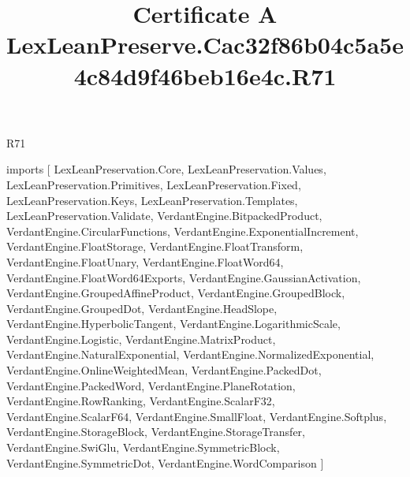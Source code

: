 \begin{lexlean}{R71}
\title{Certificate A LexLeanPreserve.Cac32f86b04c5a5e4c84d9f46beb16e4c.R71}
\begin{coremodule}
imports [
  LexLeanPreservation.Core,
  LexLeanPreservation.Values,
  LexLeanPreservation.Primitives,
  LexLeanPreservation.Fixed,
  LexLeanPreservation.Keys,
  LexLeanPreservation.Templates,
  LexLeanPreservation.Validate,
  VerdantEngine.BitpackedProduct,
  VerdantEngine.CircularFunctions,
  VerdantEngine.ExponentialIncrement,
  VerdantEngine.FloatStorage,
  VerdantEngine.FloatTransform,
  VerdantEngine.FloatUnary,
  VerdantEngine.FloatWord64,
  VerdantEngine.FloatWord64Exports,
  VerdantEngine.GaussianActivation,
  VerdantEngine.GroupedAffineProduct,
  VerdantEngine.GroupedBlock,
  VerdantEngine.GroupedDot,
  VerdantEngine.HeadSlope,
  VerdantEngine.HyperbolicTangent,
  VerdantEngine.LogarithmicScale,
  VerdantEngine.Logistic,
  VerdantEngine.MatrixProduct,
  VerdantEngine.NaturalExponential,
  VerdantEngine.NormalizedExponential,
  VerdantEngine.OnlineWeightedMean,
  VerdantEngine.PackedDot,
  VerdantEngine.PackedWord,
  VerdantEngine.PlaneRotation,
  VerdantEngine.RowRanking,
  VerdantEngine.ScalarF32,
  VerdantEngine.ScalarF64,
  VerdantEngine.SmallFloat,
  VerdantEngine.Softplus,
  VerdantEngine.StorageBlock,
  VerdantEngine.StorageTransfer,
  VerdantEngine.SwiGlu,
  VerdantEngine.SymmetricBlock,
  VerdantEngine.SymmetricDot,
  VerdantEngine.WordComparison
]


\end{coremodule}
\end{lexlean}

